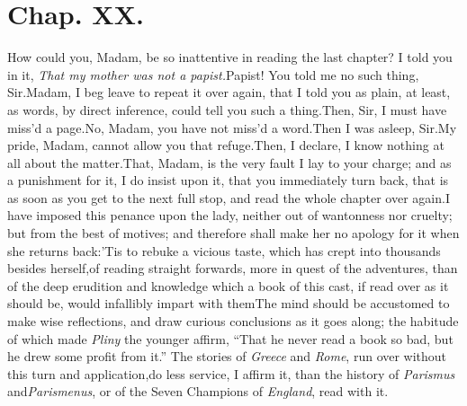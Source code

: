 \documentclass{article}
\begin{document}
\newpage
\section{Chap. XX.}

\quad\tsh How could you, Madam, be
so
inattentive in reading the last chapter? I told you in it, \textit{That my mother was not a
papist.}\tsh  Papist! You told me no such thing,
Sir.\tsk  Madam, I beg leave to repeat it over again, that I told
you as plain, at least, as words, by direct inference, could tell
you such a thing.\tsk  Then, Sir, I must have miss’d a
page.\tsk  No, Madam, you have not miss’d a word.\tsk  Then
I was asleep, Sir.\tsk  My pride, Madam, cannot allow you that
refuge.\tsk  Then, I declare, I know nothing at all about the
matter.\tsk  That, Madam, is the very fault I lay to your charge;
and as a punishment for it, I do insist upon it, that you
immediately turn back, that is as soon as you get to the next full
stop, and read the whole chapter over again.\pb I have imposed this
penance upon the lady, neither out of wantonness nor cruelty; but
from the best of motives; and therefore shall make her no apology
for it when she returns back:\tsk  ’Tis to rebuke a vicious
taste, which has crept into thousands besides herself,\tsk  of
reading straight forwards, more in quest of the adventures, than of the deep erudition
and knowledge which a book of this cast, if read over as it should
be, would infallibly impart with them\tsh  The mind should
be accustomed to make wise reflections, and draw curious
conclusions as it goes along; the habitude of which made
\textit{Pliny} the younger affirm, “That he never read a
book so bad, but he drew some profit from it.” The stories of
\textit{Greece} and \textit{Rome}, run over without this turn and
application,\tsk  do less service, I affirm it, than the history
of \textit{Parismus} and\pb \textit{Parismenus}, or of the Seven Champions
of \textit{England}, read with it.
\end{document}
